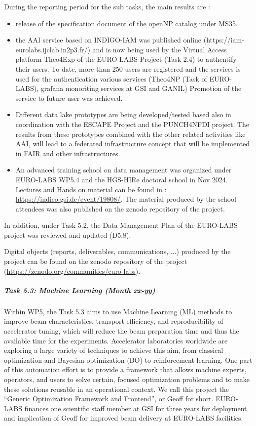 During the reporting period for the sub tasks, the main results are :
\begin{itemize}
    \item  release of the specification document of the openNP catalog under MS35.
    \item the AAI service based on INDIGO-IAM was published online (https://iam-eurolabs.ijclab.in2p3.fr/) and is now being used by the Virtual Access platform Theo4Exp of the EURO-LABS Project (Task 2.4) to authentify their users. To date, more than 250 users are registered and the services is used for the authentication various services (Theo4NP (Task of EURO-LABS), grafana monoriting services at GSI and GANIL) Promotion of the service to future user was achieved.
    \item Different data lake prototypes are being developed/tested based also in coordination with the ESCAPE Project and the PUNCH4NFDI project. The results from these prototypes combined with the other related activities like AAI, will lead to a federated infrastructure concept that will be implemented in FAIR and other infrastructures.
    \item An advanced training school on data management was organized under EURO-LABS WP5.4 and the HGS-HIRe doctoral school in Nov 2024. Lectures and Hands on material can be found in  : \url{https://indico.gsi.de/event/19808/}. The material produced by the school attendees was also published on the zenodo repository of the project. 
\end{itemize}

In addition, under Task 5.2, the Data Management Plan of the EURO-LABS project was reviewed and updated (D5.8).

Digital objects (reports, deliverables, communications, ...) produced by the project can be found on the zenodo repository of the project (\url{https://zenodo.org/communities/euro-labs}). 

\subparagraph{Task 5.3: Machine Learning (Month xx-yy)} \mbox{}



Within WP5, the Task 5.3 aims to use Machine Learning (ML) methods to improve beam characteristics, transport efficiency, and reproducibility of accelerator tuning, which will reduce the beam preparation time and thus the available time for the experiments. Accelerator laboratories worldwide are exploring a large variety of techniques to achieve this aim, from classical optimization and Bayesian optimization (BO) to reinforcement learning. One part of this automation effort is to provide a framework that allows machine experts, operators, and users to solve certain, focused optimization problems and to make these solutions reusable in an operational context. We call this project the “Generic Optimization Framework and Frontend”, or Geoff for short.  EURO-LABS finances one scientific staff
member at GSI for three years for deployment and implication of Geoff for improved beam delivery at EURO-LABS facilities.

